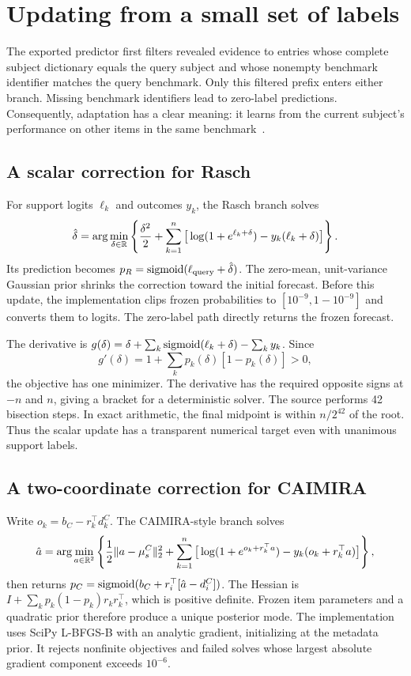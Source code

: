 \section{Updating from a small set of labels}
\label{sec:adaptation}
The exported predictor first filters revealed evidence to entries whose complete subject dictionary equals the query subject and whose nonempty benchmark identifier matches the query benchmark. Only this filtered prefix enters either branch. Missing benchmark identifiers lead to zero-label predictions. Consequently, adaptation has a clear meaning: it learns from the current subject's performance on other items in the same benchmark~\citep{release}.

\subsection{A scalar correction for Rasch}
For support logits $\ell_k$ and outcomes $y_k$, the Rasch branch solves
\begin{equation}
 \hat\delta=\arg\min_{\delta\in\mathbb{R}}
 \left\{\frac{\delta^2}{2}+\sum_{k=1}^{n}
 \big[\log(1+e^{\ell_k+\delta})-y_k(\ell_k+\delta)\big]\right\}.
 \label{eq:offset}
\end{equation}
Its prediction becomes $p_R=\operatorname{sigmoid}(\ell_{\rm query}+\hat\delta)$. The zero-mean, unit-variance Gaussian prior shrinks the correction toward the initial forecast. Before this update, the implementation clips frozen probabilities to $[10^{-9},1-10^{-9}]$ and converts them to logits. The zero-label path directly returns the frozen forecast.

The derivative is $g(\delta)=\delta+\sum_k\operatorname{sigmoid}(\ell_k+\delta)-\sum_k y_k$. Since
\begin{equation}
 g'(\delta)=1+\sum_k p_k(\delta)[1-p_k(\delta)]>0,
\end{equation}
the objective has one minimizer. The derivative has the required opposite signs at $-n$ and $n$, giving a bracket for a deterministic solver. The source performs 42 bisection steps. In exact arithmetic, the final midpoint is within $n/2^{42}$ of the root. Thus the scalar update has a transparent numerical target even with unanimous support labels.

\subsection{A two-coordinate correction for CAIMIRA}
Write $o_k=b_C-r_k^\top d_k^C$. The CAIMIRA-style branch solves
\begin{equation}
 \hat a=\arg\min_{a\in\mathbb{R}^2}
 \left\{\frac{1}{2}\|a-\mu_s^C\|_2^2+
 \sum_{k=1}^{n}\big[\log(1+e^{o_k+r_k^\top a})-y_k(o_k+r_k^\top a)\big]\right\},
 \label{eq:native}
\end{equation}
then returns $p_C=\operatorname{sigmoid}(b_C+r_i^\top[\hat a-d_i^C])$. The Hessian is
$I+\sum_k p_k(1-p_k)r_kr_k^\top$, which is positive definite. Frozen item parameters and a quadratic prior therefore produce a unique posterior mode. The implementation uses SciPy L-BFGS-B with an analytic gradient, initializing at the metadata prior. It rejects nonfinite objectives and failed solves whose largest absolute gradient component exceeds $10^{-6}$.

